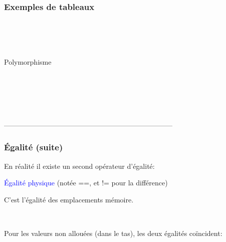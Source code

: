 %
\begin{frame}
\frametitle{Exemples de tableaux}

\\
\\
\\

Polymorphisme

\\
\\
\\
\\

\end{frame}

------------------------------------------------------------------------
%
\begin{frame}
\frametitle{\'{E}galité (suite)}

En réalité il existe un second opérateur d'égalité:

\textcolor{blue}{\'{E}galité physique} (notée \textsf{==}, et \textsf{!=} pour la
différence)

C'est l'égalité des emplacements mémoire.

\\

Pour les valeurs non allouées (dans le tas), les deux égalités
coïncident:

\\

\end{frame}



